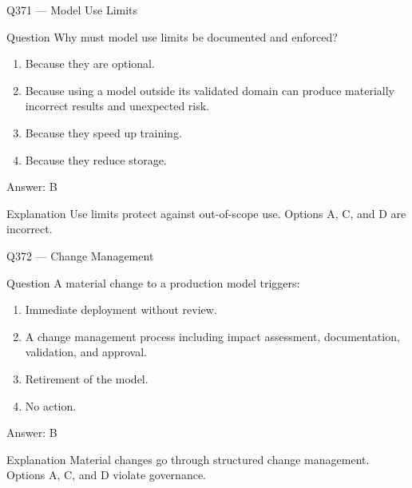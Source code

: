 \documentclass[aspectratio=169,8pt]{beamer}
\begin{document}
	\begin{frame}{Q371 --- Model Use Limits}
		\begin{block}{Question}
			Why must model use limits be documented and enforced?
			\begin{enumerate}
				\item Because they are optional.
				\item Because using a model outside its validated domain can produce materially incorrect results and unexpected risk.
				\item Because they speed up training.
				\item Because they reduce storage.
			\end{enumerate}
		\end{block}
		\begin{exampleblock}{Answer: B}\end{exampleblock}
		\begin{block}{Explanation}
			Use limits protect against out-of-scope use. Options A, C, and D are incorrect.
		\end{block}
	\end{frame}
	
	\begin{frame}{Q372 --- Change Management}
		\begin{block}{Question}
			A material change to a production model triggers:
			\begin{enumerate}
				\item Immediate deployment without review.
				\item A change management process including impact assessment, documentation, validation, and approval.
				\item Retirement of the model.
				\item No action.
			\end{enumerate}
		\end{block}
		\begin{exampleblock}{Answer: B}\end{exampleblock}
		\begin{block}{Explanation}
			Material changes go through structured change management. Options A, C, and D violate governance.
		\end{block}
	\end{frame}
	
\end{document}
